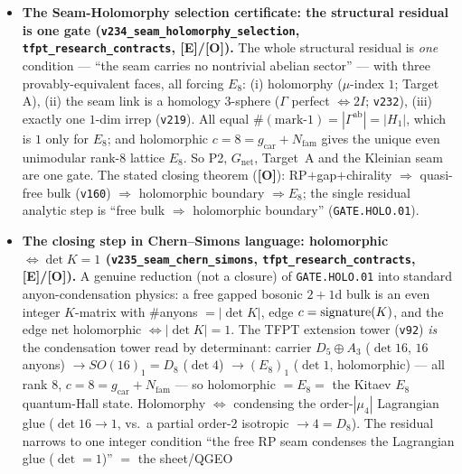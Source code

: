 \documentclass[11pt]{article}
\providecommand{\mE}{\textbf{[E]}}\providecommand{\mC}{\textbf{[C]}}
\providecommand{\mO}{\textbf{[O]}}\providecommand{\mX}{\textbf{[X]}}
\providecommand{\vref}[1]{\texttt{#1}}
\providecommand{\gcar}{g_{\mathrm{car}}}\providecommand{\Nfam}{N_{\mathrm{fam}}}
\begin{document}
\begin{itemize}
  $\mu_6=\mu_3$(family/triality)$\times\mu_2$(sheet) factorisation: $\rho=\omega^2(-1)$ with $\omega=e^{2\pi i/3}$
  the $\Z_3$ triality centre (the $2/3$ cusp weight). Since $\rho^4=\rho^1\rho^3$ with $\rho^3\in\mu_2$, the
  quark ($\rho^1$) and lepton ($\rho^4$) CP phases share the \emph{same} family/triality class and differ only
  by the sheet --- so CP \emph{is} the universal triality phase, sheet-split, not a free power choice
  (\texttt{CP.TRIALITY.01}).
\item \textbf{The Seam-Holomorphy selection certificate: the structural residual is one gate
  (\texttt{v234\_seam\_holomorphy\_selection}, \texttt{tfpt\_research\_contracts}, \mE/\mO).} The whole
  structural residual is \emph{one} condition --- ``the seam carries no nontrivial abelian sector'' --- with
  three provably-equivalent faces, all forcing $E_8$: (i) holomorphy ($\mu$-index $1$; Target A), (ii) the
  seam link is a homology $3$-sphere ($\Gamma$ perfect $\Leftrightarrow2I$; \vref{v232}), (iii) exactly one
  $1$-dim irrep (\vref{v219}). All equal $\#(\text{mark-}1)=|\Gamma^{\mathrm{ab}}|=|H_1|$, which is $1$ only
  for $E_8$; and holomorphic $c{=}8{=}\gcar{+}\Nfam$ gives the unique even unimodular rank-$8$ lattice $E_8$.
  So P2, $G_{\mathrm{net}}$, Target~A and the Kleinian seam are one gate. The stated closing theorem
  (\mO): RP$+$gap$+$chirality $\Rightarrow$ quasi-free bulk (\vref{v160}) $\Rightarrow$ holomorphic boundary
  $\Rightarrow E_8$; the single residual analytic step is ``free bulk $\Rightarrow$ holomorphic boundary''
  (\texttt{GATE.HOLO.01}).
\item \textbf{The closing step in Chern--Simons language: holomorphic $\Leftrightarrow\det K{=}1$
  (\texttt{v235\_seam\_chern\_simons}, \texttt{tfpt\_research\_contracts}, \mE/\mO).} A genuine reduction
  (not a closure) of \texttt{GATE.HOLO.01} into standard anyon-condensation physics: a free gapped bosonic
  $2{+}1$d bulk is an even integer $K$-matrix with $\#$anyons $=|\det K|$, edge $c={\rm signature}(K)$, and
  the edge net holomorphic $\Leftrightarrow|\det K|{=}1$. The TFPT extension tower (\vref{v92}) \emph{is} the
  condensation tower read by determinant: carrier $D_5{\oplus}A_3$ ($\det16$, $16$ anyons) $\to SO(16)_1{=}D_8$
  ($\det4$) $\to(E_8)_1$ ($\det1$, holomorphic) --- all rank $8$, $c{=}8{=}\gcar{+}\Nfam$ --- so holomorphic
  $=E_8=$ the Kitaev $E_8$ quantum-Hall state. Holomorphy $\Leftrightarrow$ condensing the order-$|\mu_4|$
  Lagrangian glue ($\det16{\to}1$, vs.\ a partial order-$2$ isotropic $\to4{=}D_8$). The residual narrows to
  one integer condition ``the free RP seam condenses the Lagrangian glue ($\det{=}1$)'' $=$ the sheet/QGEO

\end{itemize}
\end{document}
